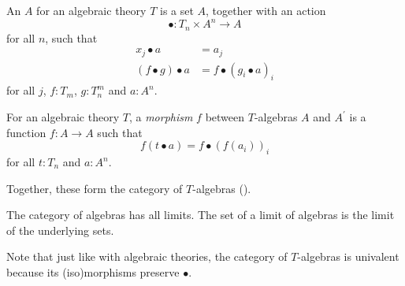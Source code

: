 \begin{definition}
  An  $ A $ for an algebraic theory $ T $ is a set $ A $, together with an action
  \[ \bullet: T_n \times A^n \to A \]
  for all $ n $, such that
  \begin{align*}
    x_j \bullet a &= a_j\\
    (f \bullet g) \bullet a &= f \bullet (g_i \bullet a)_i
  \end{align*}
  for all $ j $, $ f: T_m $, $ g: T_n^m $ and $ a: A^n $.
\end{definition}

\begin{definition}
  For an algebraic theory $ T $, a \textit{morphism} $ f $ between $ T $-algebras $ A $ and $ A^\prime $ is a function $ f: A \to A $ such that
  \[ f(t \bullet a) = f \bullet (f(a_i))_i \]
  for all $ t: T_n $ and $ a: A^n $.
\end{definition}

Together, these form the category of $ T $-algebras  ().

\begin{remark}
  The category of algebras has all limits. The set of a limit of algebras is the limit of the underlying sets.
\end{remark}

\begin{remark}
  Note that just like with algebraic theories, the category of $ T $-algebras is univalent because its (iso)morphisms preserve $ \bullet $.
\end{remark}

